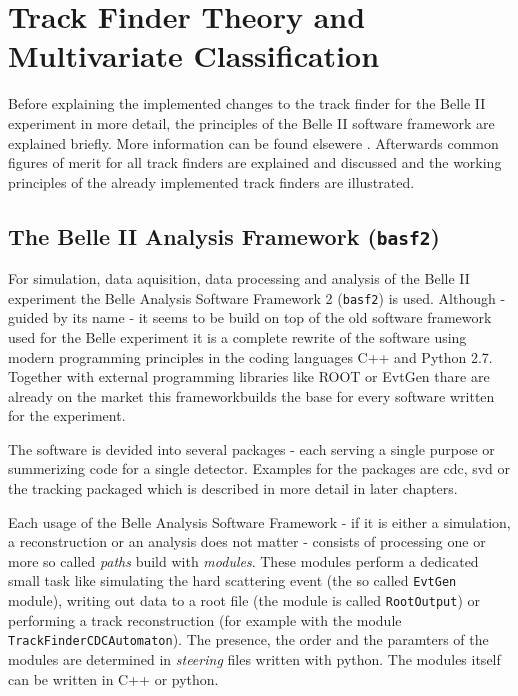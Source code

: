 \chapter{Track Finder Theory and Multivariate Classification}

Before explaining the implemented changes to the track finder for the Belle II experiment in more detail, the principles of the Belle II software framework are explained briefly. More information can be found elsewere . Afterwards common figures of merit for all track finders are explained and discussed and the working principles of the already implemented track finders are illustrated. 

\section{The Belle II Analysis Framework (\texttt{basf2})}

For simulation, data aquisition, data processing and analysis of the Belle II experiment the Belle Analysis Software Framework 2 (\texttt{basf2}) is used. Although - guided by its name - it seems to be build on top of the old software framework used for the Belle experiment it is a complete rewrite of the software using modern programming principles in the coding languages C++ and Python 2.7. Together with external programming libraries like ROOT or EvtGen thare are already on the market this frameworkbuilds the base for every software written for the experiment. 

The software is devided into several packages - each serving a single purpose or summerizing code for a single detector. Examples for the packages are cdc, svd or the tracking packaged which is described in more detail in later chapters.

Each usage of the Belle Analysis Software Framework - if it is either a simulation, a reconstruction or an analysis does not matter - consists of processing one or more so called \emph{paths} build with \emph{modules}. These modules perform a dedicated small task like simulating the hard scattering event (the so called \texttt{EvtGen} module), writing out data to a root file (the module is called \texttt{RootOutput}) or performing a track reconstruction (for example with the module \texttt{TrackFinderCDCAutomaton}). The presence, the order and the paramters of the modules are determined in \emph{steering} files written with python. The modules itself can be written in C++ or python. 

